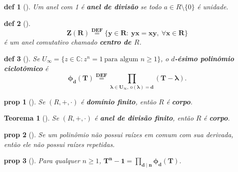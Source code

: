 \documentclass[11pt]{article}
\newcommand{\defname}[1]{\colorbox{yellow!30}{\strut \textbf{#1}}}
\newtheorem*{theorem}{Teorema}
\newtheorem*{proposition}{prop}
\newtheorem*{definition}{def}
\theoremstyle{definition}
\begin{document}
\begin{multicols}{3}
\begin{definition}[\defname{Anel de Divisão}]
Um anel com 1 é \textbf{anel de divisão} se todo \(a\in R\setminus\{0\}\) é unidade.
\end{definition}

\begin{definition}[\defname{Centro do Anel}]
\[
\mathbf{Z(R)\stackrel{\text{DEF}}{=}\{y\in R:\ yx=xy,\ \forall x\in R\}}
\]
é um anel comutativo chamado \textbf{centro de $R$}.
\end{definition}

\begin{definition}[\defname{Polinômio Ciclotômico}]
Se \(U_\infty=\{z\in\mathbb{C}: z^n=1\ \text{para algum }n\ge 1\}\), o \textbf{$d$-ésimo polinômio ciclotômico} é
\[
\mathbf{\phi_d(T)\stackrel{\text{DEF}}{=}\prod_{\lambda\in U_\infty,\ \mathrm{o}(\lambda)=d}(T-\lambda)}.
\]
\end{definition}



\begin{proposition}[\defname{Domínio Finito é Corpo}]
Se \((R,+,\cdot)\) é \textbf{domínio finito}, então \(R\) é \textbf{corpo}.
\end{proposition}

\begin{theorem}[\defname{Wedderburn}]
Se \((R,+,\cdot)\) é \textbf{anel de divisão finito}, então \(R\) é \textbf{corpo}.
\end{theorem}

\begin{proposition}[\defname{Critério da Deri. para Separabilidade}]
Se um polinômio não possui raízes em comum com sua derivada, então ele não possui raízes repetidas.
\end{proposition}

\begin{proposition}[\defname{Fatoração de \(T^n-1\)}]
Para qualquer \(n\ge 1\),
$
\mathbf{T^n-1=\prod_{d\mid n}\phi_d(T)}.
$
\end{proposition}


\end{multicols}
\end{document}
